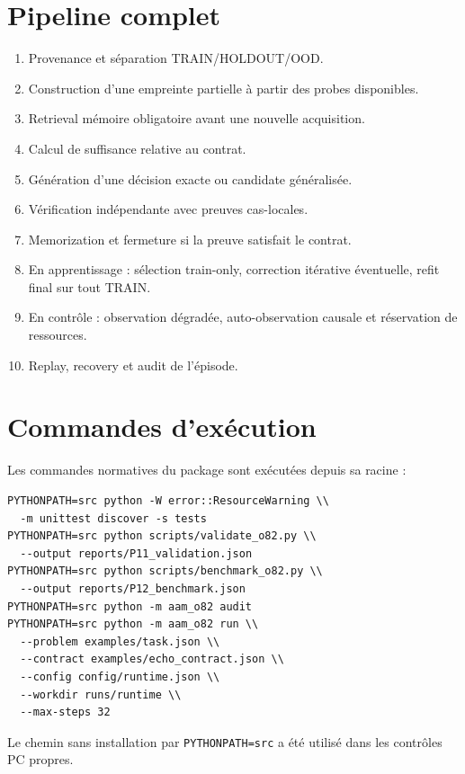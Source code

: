 \documentclass[11pt,a4paper]{report}
\begin{document}
\chapter{Pipeline complet}
\begin{enumerate}
\item Provenance et séparation TRAIN/HOLDOUT/OOD.
\item Construction d'une empreinte partielle à partir des probes disponibles.
\item Retrieval mémoire obligatoire avant une nouvelle acquisition.
\item Calcul de suffisance relative au contrat.
\item Génération d'une décision exacte ou candidate généralisée.
\item Vérification indépendante avec preuves cas-locales.
\item Memorization et fermeture si la preuve satisfait le contrat.
\item En apprentissage : sélection train-only, correction itérative éventuelle, refit final sur tout TRAIN.
\item En contrôle : observation dégradée, auto-observation causale et réservation de ressources.
\item Replay, recovery et audit de l'épisode.
\end{enumerate}

\chapter{Commandes d'exécution}
Les commandes normatives du package sont exécutées depuis sa racine :
\begin{verbatim}
PYTHONPATH=src python -W error::ResourceWarning \\
  -m unittest discover -s tests
PYTHONPATH=src python scripts/validate_o82.py \\
  --output reports/P11_validation.json
PYTHONPATH=src python scripts/benchmark_o82.py \\
  --output reports/P12_benchmark.json
PYTHONPATH=src python -m aam_o82 audit
PYTHONPATH=src python -m aam_o82 run \\
  --problem examples/task.json \\
  --contract examples/echo_contract.json \\
  --config config/runtime.json \\
  --workdir runs/runtime \\
  --max-steps 32
\end{verbatim}
Le chemin sans installation par \texttt{PYTHONPATH=src} a été utilisé dans les contrôles PC propres.
\end{document}
